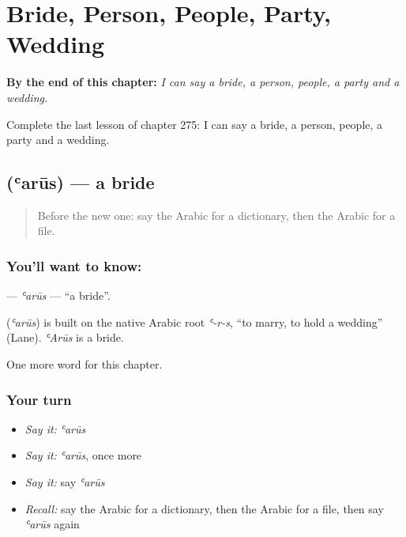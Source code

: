 
\chapter{Bride, Person, People, Party, Wedding}
\label{ch:ar-bride-person-people-party-wedding}

\begin{chapteropening}
\textbf{By the end of this chapter:} \emph{I can say a bride, a person, people, a party and a wedding.}

Complete the last lesson of chapter 275: I can say a bride, a person, people, a party and a wedding.
\end{chapteropening}

\section[\texorpdfstring{\ar{عروس} (ʿarūs)}{عروس (ʿarūs)}]{ (ʿarūs) — a bride}

\label{lesson:AR-C275-arus}



\begin{quote}
Before the new one: say the Arabic for a dictionary, then the Arabic for a file.
\end{quote}

\subsection*{You'll want to know: }
\textbf{} — \emph{ʿarūs} — \textquotedblleft{}a bride\textquotedblright{}.

\begin{cousinweb}
\textbf{} (\emph{ʿarūs}) is built on the native Arabic root \emph{ʿ-r-s}, \textquotedblleft{}to marry, to hold a wedding\textquotedblright{} (Lane). \emph{ʿArūs} is a bride.
\end{cousinweb}

\begin{grammarlens}[title={What you've built}]
One more word for this chapter.
\end{grammarlens}

\subsection*{Your turn}
\begin{itemize}
\raggedright
  \item \emph{Say it:} \emph{ʿarūs}
  \item \emph{Say it:} \emph{ʿarūs}, once more
  \item \emph{Say it:} say \emph{ʿarūs}
  \item \emph{Recall:} say the Arabic for a dictionary, then the Arabic for a file, then say \emph{ʿarūs} again
\end{itemize}

